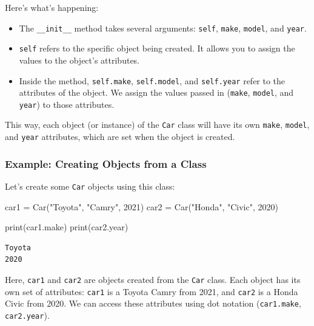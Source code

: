 \documentclass[
  letterpaper,
  DIV=11,
  numbers=noendperiod]{scrreprt}
\newenvironment{Shaded}{\begin{snugshade}}{\end{snugshade}}
\newcommand{\BuiltInTok}[1]{\textcolor[rgb]{0.00,0.23,0.31}{#1}}
\newcommand{\DecValTok}[1]{\textcolor[rgb]{0.68,0.00,0.00}{#1}}
\newcommand{\NormalTok}[1]{\textcolor[rgb]{0.00,0.23,0.31}{#1}}
\newcommand{\OperatorTok}[1]{\textcolor[rgb]{0.37,0.37,0.37}{#1}}
\newcommand{\StringTok}[1]{\textcolor[rgb]{0.13,0.47,0.30}{#1}}
\providecommand{\tightlist}{%
  \setlength{\itemsep}{0pt}\setlength{\parskip}{0pt}}\usepackage{longtable,booktabs,array}
\begin{document}
Here's what's happening:

\begin{itemize}
\tightlist
\item
  The \texttt{\_\_init\_\_} method takes several arguments:
  \texttt{self}, \texttt{make}, \texttt{model}, and \texttt{year}.
\item
  \texttt{self} refers to the specific object being created. It allows
  you to assign the values to the object's attributes.
\item
  Inside the method, \texttt{self.make}, \texttt{self.model}, and
  \texttt{self.year} refer to the attributes of the object. We assign
  the values passed in (\texttt{make}, \texttt{model}, and
  \texttt{year}) to those attributes.
\end{itemize}

This way, each object (or instance) of the \texttt{Car} class will have
its own \texttt{make}, \texttt{model}, and \texttt{year} attributes,
which are set when the object is created.

\hypertarget{example-creating-objects-from-a-class}{%
\subsubsection{Example: Creating Objects from a
Class}\label{example-creating-objects-from-a-class}}

Let's create some \texttt{Car} objects using this class:

\begin{Shaded}
\begin{Highlighting}[]
\NormalTok{car1 }\OperatorTok{=}\NormalTok{ Car(}\StringTok{"Toyota"}\NormalTok{, }\StringTok{"Camry"}\NormalTok{, }\DecValTok{2021}\NormalTok{)}
\NormalTok{car2 }\OperatorTok{=}\NormalTok{ Car(}\StringTok{"Honda"}\NormalTok{, }\StringTok{"Civic"}\NormalTok{, }\DecValTok{2020}\NormalTok{)}

\BuiltInTok{print}\NormalTok{(car1.make)  }
\BuiltInTok{print}\NormalTok{(car2.year)  }
\end{Highlighting}
\end{Shaded}

\begin{verbatim}
Toyota
2020
\end{verbatim}

Here, \texttt{car1} and \texttt{car2} are objects created from the
\texttt{Car} class. Each object has its own set of attributes:
\texttt{car1} is a Toyota Camry from 2021, and \texttt{car2} is a Honda
Civic from 2020. We can access these attributes using dot notation
(\texttt{car1.make}, \texttt{car2.year}).
\end{document}
